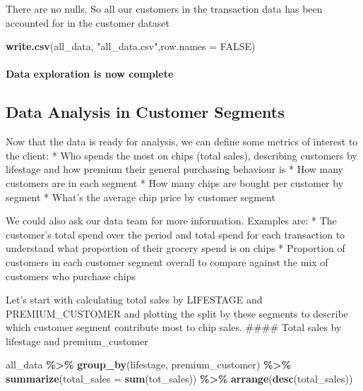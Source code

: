 \documentclass[
]{article}
\newenvironment{Shaded}{\begin{snugshade}}{\end{snugshade}}
\newcommand{\AttributeTok}[1]{\textcolor[rgb]{0.13,0.29,0.53}{#1}}
\newcommand{\ConstantTok}[1]{\textcolor[rgb]{0.56,0.35,0.01}{#1}}
\newcommand{\FunctionTok}[1]{\textcolor[rgb]{0.13,0.29,0.53}{\textbf{#1}}}
\newcommand{\NormalTok}[1]{#1}
\newcommand{\SpecialCharTok}[1]{\textcolor[rgb]{0.81,0.36,0.00}{\textbf{#1}}}
\newcommand{\StringTok}[1]{\textcolor[rgb]{0.31,0.60,0.02}{#1}}
\begin{document}
There are no nulls. So all our customers in the transaction data has
been accounted for in the customer dataset

\begin{Shaded}
\begin{Highlighting}[]
\FunctionTok{write.csv}\NormalTok{(all\_data, }\StringTok{"all\_data.csv"}\NormalTok{,}\AttributeTok{row.names =} \ConstantTok{FALSE}\NormalTok{)}
\end{Highlighting}
\end{Shaded}

\hypertarget{data-exploration-is-now-complete}{%
\paragraph{Data exploration is now
complete}\label{data-exploration-is-now-complete}}

\hypertarget{data-analysis-in-customer-segments}{%
\subsection{Data Analysis in Customer
Segments}\label{data-analysis-in-customer-segments}}

Now that the data is ready for analysis, we can define some metrics of
interest to the client: * Who spends the most on chips (total sales),
describing customers by lifestage and how premium their general
purchasing behaviour is * How many customers are in each segment * How
many chips are bought per customer by segment * What's the average chip
price by customer segment

We could also ask our data team for more information. Examples are: *
The customer's total spend over the period and total spend for each
transaction to understand what proportion of their grocery spend is on
chips * Proportion of customers in each customer segment overall to
compare against the mix of customers who purchase chips

Let's start with calculating total sales by LIFESTAGE and
PREMIUM\_CUSTOMER and plotting the split by these segments to describe
which customer segment contribute most to chip sales. \#\#\#\# Total
sales by lifestage and premium\_customer

\begin{Shaded}
\begin{Highlighting}[]
\NormalTok{all\_data }\SpecialCharTok{\%\textgreater{}\%}
  \FunctionTok{group\_by}\NormalTok{(lifestage, premium\_customer) }\SpecialCharTok{\%\textgreater{}\%}
  \FunctionTok{summarize}\NormalTok{(}\AttributeTok{total\_sales =} \FunctionTok{sum}\NormalTok{(tot\_sales)) }\SpecialCharTok{\%\textgreater{}\%}
  \FunctionTok{arrange}\NormalTok{(}\FunctionTok{desc}\NormalTok{(total\_sales))}
\end{Highlighting}
\end{Shaded}
\end{document}
